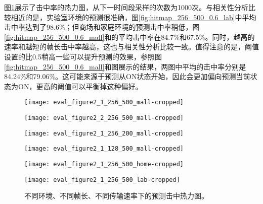 图\ref{fig:hitmap}展示了击中率的热力图，从下一时间段采样的次数为1000次。与相关性分析比较相近的是，实验室环境的预测很准确，图\ref{fig:hitmap_256_500_0.6_lab}中平均击中率达到了98.6\%；但商场和家庭环境的预测击中率稍低，图\ref{fig:hitmap_256_500_0.6_mall}和的平均击中率在84.7\%和67.5\%。同时，越高的速率和越短的帧长击中率越高，这也与相关性分析比较一致。值得注意的是，阈值设置的比0.5稍高一些可以提升预测的效果，参照图\ref{fig:hitmap_256_500_0.6_mall}和图展示的结果，两图中平均的击中率分别是84.24\%和79.06\%。这可能来源于预测从ON状态开始，因此会更加偏向预测当前状态为ON，更高的阈值可以平衡掉这种偏好。
\begin{figure}[t]
	\begin{minipage}[b]{.32\linewidth}
		\texttt{[image: eval\_figure2\_1\_256\_500\_mall-cropped]}
		\label{fig:hitmap_256_500_0.6_mall}
	\end{minipage}
	\hfill
	\begin{minipage}[b]{.32\linewidth}
		\texttt{[image: eval\_figure2\_2\_256\_500\_mall-cropped]}
		\label{fig:hitmap_256_500_0.5_mall}
	\end{minipage}
	\hfill
	\begin{minipage}[b]{.32\linewidth}
		\texttt{[image: eval\_figure2\_1\_256\_200\_mall-cropped]}
		\label{fig:hitmap_256_200_0.6_mall}
	\end{minipage}
	
	\begin{minipage}[b]{.32\linewidth}
		\texttt{[image: eval\_figure2\_1\_128\_500\_mall-cropped]}
		\label{fig:hitmap_128_500_0.6_mall}
	\end{minipage}
	\hfill
	\begin{minipage}[b]{.32\linewidth}
		\texttt{[image: eval\_figure2\_1\_256\_500\_home-cropped]}
		\label{fig:hitmap_256_500_0.6_home}
	\end{minipage}
	\hfill
	\begin{minipage}[b]{.32\linewidth}
		\texttt{[image: eval\_figure2\_1\_256\_500\_lab-cropped]}
		\label{fig:hitmap_256_500_0.6_lab}
	\end{minipage}
	\caption{不同环境、不同帧长、不同传输速率下的预测击中热力图。}\label{fig:hitmap}
\end{figure}

